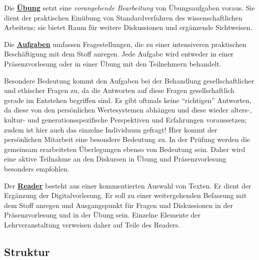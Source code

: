 \documentclass[a4paper]{article}%
\begin{document}
Die \hyperref[Ubung]{\textbf{Übung}} setzt eine \textit{vorangehende Bearbeitung} von Übungsaufgaben voraus.
Sie dient der praktischen Einübung von Standardverfahren des wissenschaftlichen Arbeitens; sie bietet
Raum für weitere Diskussionen und ergänzende Sichtweisen.

Die \hyperref[auf]{\textbf{Aufgaben}} umfassen Fragestellungen, die zu einer intensiveren praktischen
Beschäftigung mit dem Stoff anregen. Jede Aufgabe
wird entweder in einer Präsenzvorlesung oder in einer Übung mit den Teilnehmern behandelt.

Besondere Bedeutung kommt den Aufgaben bei der Behandlung gesellschaftlicher und ethischer Fragen zu,
da die Antworten auf diese Fragen gesellschaftlich gerade im Entstehen begriffen sind.
Es gibt oftmals keine \enquote{richtigen} Antworten, da diese von den persönlichen
Wertesystemen abhängen und diese wieder alters-, kultur- und generationsspezifische Perspektiven
und Erfahrungen voraussetzen; zudem ist hier auch das einzelne Individuum gefragt!
Hier kommt der persönlichen Mitarbeit eine besondere Bedeutung zu. In der Prüfung werden die gemeinsam erarbeiteten
Überlegungen ebenso von Bedeutung sein. Daher wird eine aktive Teilnahme an den Diskursen in 
Übung und Präsenzvorlesung besonders empfohlen.

Der \hyperref[Reader1]{\textbf{Reader}} besteht aus einer kommentierten Auswahl von Texten. Er dient der Ergänzung der
Digitalvorlesung. Er soll zu einer weitergehenden Befassung mit dem Stoff anregen und Ausgangspunkt für
Fragen und Diskussionen in der Präsenzvorlesung und in der Übung sein.
Einzelne Elemente der Lehrveranstaltung verweisen daher auf Teile des Readers.






\pagebreak



\subsection{Struktur}


\def\blu{\cellcolor{blue!25}}
\def\red{\cellcolor{red!25}}
\def\yel{\cellcolor{yellow!25}}
\def\gre{\cellcolor{green!25}}


\def\VL#1{\hyperref[VLIW#1]{\textbf{VL #1}}}
\def\UE#1{\hyperref[UEIW#1]{\textbf{UE #1}}}

\def\H#1{\hyperref[H#1]{\textbf{#1}}}
\end{document}
